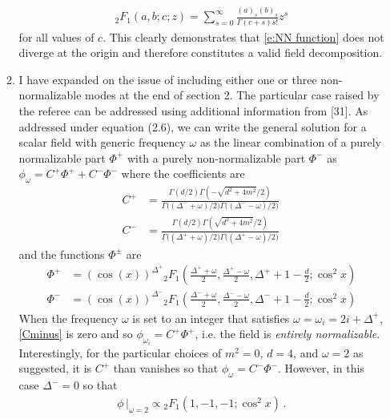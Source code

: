\documentclass[11pt,letterpaper]{article}
\begin{document}
\begin{enumerate}
\begin{enumerate}
\begin{align}
            {_2}F_1 (a, b; c; z) = \sum_{s = 0}^\infty \frac{(a)_s (b)_s}{\Gamma(c + s) s!} z^s
        \end{align}
        for all values of $c$. This clearly demonstrates that \eqref{e:NN function} does not
        diverge at the origin and therefore constitutes a valid field decomposition.
        \item I have expanded on the issue of including either one or three non-normalizable modes at the end of section 2. The particular case raised by the referee can be addressed using additional information from [31]. As addressed under equation (2.6), we can write the general solution for a scalar field with generic frequency $\omega$ as the linear combination of a purely normalizable part $\Phi^+$ with a purely non-normalizable part $\Phi^-$ as ${\phi_\omega = C^+ \Phi^+ + C^- \Phi^-}$ where the coefficients are
        \begin{align}
            \label{Cplus}
            C^+ &= \frac{\Gamma(d/2) \Gamma(- \sqrt{d^2 + 4m^2} / 2)}{\Gamma\Big( (\Delta^- + \omega)/2 \Big) \Gamma\Big( (\Delta^- - \omega) / 2 \Big)} \\
            \label{Cminus}
            C^- &= \frac{\Gamma(d/2) \Gamma(\sqrt{d^2 + 4m^2} / 2)}{\Gamma \Big( (\Delta^+ + \omega) / 2 \Big) \Gamma \Big( (\Delta^+ - \omega) / 2 \Big)} \, 
        \end{align}
        and the functions $\Phi^\pm$ are
        \begin{align}
            \label{Phiplus}
            \Phi^+ &= \left( \cos(x) \right)^{\Delta^+} {_2}F_1 \left( \frac{\Delta^+ + \omega}{2}, \frac{\Delta^+ - \omega}{2}, \Delta^+ +1 - \frac{d}{2}; \cos^2 x \right) \\
            \label{Phiminus}
            \Phi^- &= \left( \cos(x) \right)^{\Delta^-} {_2}F_1 \left( \frac{\Delta^- + \omega}{2}, \frac{\Delta^- - \omega}{2}, \Delta^- + 1 - \frac{d}{2} ; \cos^2 x \right)
        \end{align}
        When the frequency $\omega$ is set to an integer that satisfies ${\omega = \omega_i = 2i + \Delta^+}$, \eqref{Cminus} is zero and so $\phi_{\omega_i} = C^+ \Phi^+$, i.e. the field is \emph{entirely normalizable}. Interestingly, for the particular choices of $m^2 = 0$, $d=4$, and $\omega = 2$ as suggested, it is $C^+$ than vanishes so that $\phi_\omega = C^- \Phi^-$. However, in this case ${\Delta^- = 0}$ so that
        \begin{align}
            \phi\,\Big|_{\omega = 2} \propto {_2}F_1 \left( 1, -1, -1; \cos^2 x \right) \, .

\end{align}
\end{enumerate}
\end{enumerate}
\end{document}
